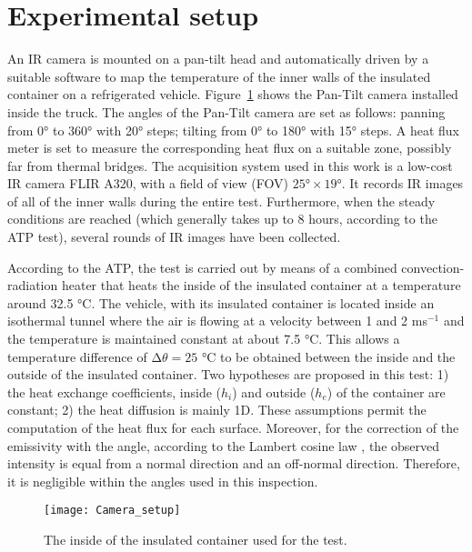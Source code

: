 \documentclass{tQRT2e}
\begin{document}
\section{Experimental setup}
An IR camera is mounted on a pan-tilt head and automatically driven by a suitable software to map the temperature of the inner walls of the insulated container on a refrigerated vehicle. Figure~\ref{Exp_setup} shows the Pan-Tilt camera installed inside the truck. The angles of the Pan-Tilt camera are set as follows: panning from 0° to 360° with 20° steps; tilting from 0° to 180° with 15° steps. A heat flux meter is set to measure the corresponding heat flux on a suitable zone, possibly far from thermal bridges. The acquisition system used in this work is a low-cost IR camera FLIR A320, with a field of view (FOV) $ 25°×19° $. It records IR images of all of the inner walls during the entire test. Furthermore, when the steady conditions are reached (which generally takes up to 8 hours, according to the ATP test), several rounds of IR images have been collected.

According to the ATP, the test is carried out by means of a combined convection-radiation heater that heats the inside of the insulated container at a temperature around 32.5 °C. The vehicle, with its insulated container is located inside an isothermal tunnel where the air is flowing at a velocity between 1 and 2 ms$^{−1}$ and the temperature is maintained constant at about 7.5 °C. This allows a temperature difference of $ ∆\theta  = 25 $ °C to be obtained between the inside and the outside of the insulated container. Two hypotheses are proposed in this test: 1) the heat exchange coefficients, inside ($ h_i $) and outside ($ h_e $) of the container are constant; 2) the heat diffusion is mainly 1D. These assumptions permit the computation of the heat flux for each surface. Moreover, for the correction of the emissivity with the angle, according to the Lambert cosine law \cite{dragano2009experimental,Hottel1967a}, the observed intensity is equal from a normal direction and an off-normal direction. Therefore, it is negligible within the angles used  in this inspection.
\begin{figure}[ht]
	\centering
	\texttt{[image: Camera\_setup]}
	\caption{The inside of the insulated container used for the test.}
	\label{Exp_setup}
\end{figure}
\end{document}
